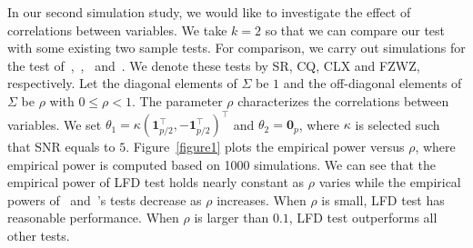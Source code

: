 \documentclass[12pt]{article} %
\DeclareMathOperator{\mytr}{tr}
\newcommand{\bC}{\mathbf{C}}
\newcommand{\bfsym}[1]{\ensuremath{\boldsymbol{#1}}}
\def\bSigma {\bfsym {\Sigma}}
\def\bTheta {\bfsym {\Theta}}
\theoremstyle{definition}
\begin{document}
In our second simulation study, we would like to investigate the effect of correlations between variables.
We take $k=2$ so that we can compare our test with some existing two sample tests.
For comparison, we carry out simulations for the test of~\cite{Srivastava2007Multivariate},~\cite{Chen2010A},~\cite{Tony2013} and~\cite{Feng2014Two}.
We denote these tests by SR, CQ, CLX and FZWZ, respectively.
Let the diagonal elements of $\Sigma$ be $1$ and the off-diagonal elements of $\Sigma$ be $\rho$ with $0\leq \rho<1$.
The parameter $\rho$ characterizes the correlations between variables.
We set $\theta_1=\kappa (\textbf{1}_{p/2}^\top,-\textbf{1}_{p/2}^\top)^\top$ and $\theta_2=\mathbf{0}_p$, where $\kappa$ is selected such that SNR equals to $5$.
Figure~\ref{figure1} plots the empirical power versus $\rho$, where empirical power is computed based on 1000 simulations.
We can see that the empirical power of LFD test holds nearly constant as $\rho$ varies while the empirical powers of~\cite{Chen2010A} and~\cite{Feng2014Two}'s tests decrease as $\rho$ increases.
When $\rho$ is small,  LFD test has reasonable performance. When $\rho$ is larger than $0.1$, LFD test outperforms all other tests.


\end{document}

